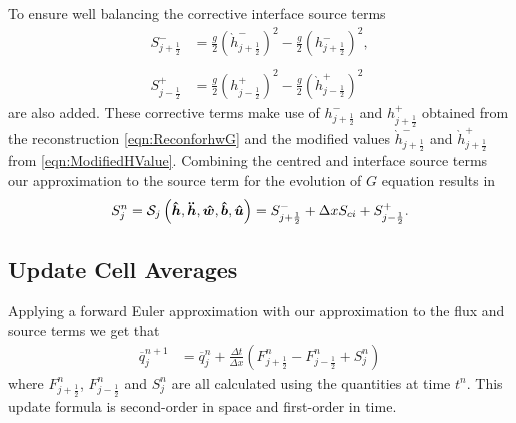 To ensure well balancing the corrective interface source terms
	\begin{align*}
	 S^{-}_{j + \frac{1}{2}} &=  \frac{g}{2} \left(\grave{h}^{-}_{j + \frac{1}{2}} \right)^2 - \frac{g}{2} \left(h^{-}_{j + \frac{1}{2}} \right)^2, \\ \\
	  S^{+}_{j - \frac{1}{2}} &=  \frac{g}{2} \left(h^{+}_{j - \frac{1}{2}}\right)^2 - \frac{g}{2}\left(\grave{h}^{+}_{j - \frac{1}{2}}\right)^2 
	\end{align*}
are also added. These corrective terms make use of $h^{-}_{j + \frac{1}{2}}$ and $h^{+}_{j + \frac{1}{2}}$ obtained from the reconstruction \eqref{eqn:ReconforhwG} and the modified values $\grave{h}^{-}_{j + \frac{1}{2}}$ and $\grave{h}^{+}_{j + \frac{1}{2}}$ from \eqref{eqn:ModifiedHValue}. Combining the centred and interface source terms our approximation to the source term for the evolution of $G$ equation results in 
\begin{equation}
S^n_j = \mathcal{S}_j\left( \boldsymbol{\hat{h}},\boldsymbol{\ddot{h}},\boldsymbol{\hat{w}},\boldsymbol{\hat{b}}, \boldsymbol{\hat{u}}  \right) =  S^{-}_{j + \frac{1}{2}} + \Delta x S_{ci} + S^{+}_{j - \frac{1}{2}}.
\label{eqn:SourceTerm}
\end{equation}


\subsection{Update Cell Averages}
Applying a forward Euler approximation with our approximation to the flux and source terms we get that
\begin{align}
\overline{q}^{n+1}_j &= \overline{q}^{n}_j + \frac{\Delta t}{\Delta x} \left(F^n_{j+\frac{1}{2}} - F^n_{j-\frac{1}{2}} + S^n_j\right)
\label{eqn:UpdateMethod}
\end{align}
where $F^n_{j+\frac{1}{2}}$, $F^n_{j-\frac{1}{2}}$ and $S^n_j$ are all calculated using the quantities at time $t^n$. This update formula is second-order in space and first-order in time.


